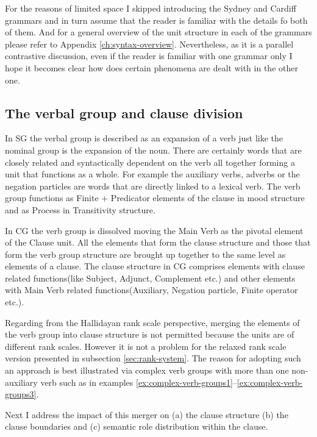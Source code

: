 For the reasons of limited space I skipped introducing the Sydney and Cardiff grammars and in turn assume that the reader is familiar with the details fo both of them. And for a general overview of the unit structure in each of the grammars please refer to Appendix \ref{ch:syntax-overview}. Nevertheless, as it is a parallel contrastive discussion, even if the reader is familiar with one grammar only I hope it becomes clear how does certain phenomena are dealt with in the other one. 

\subsection{The verbal group and clause division}
\label{sec:verbal-grpoup-and-clause-division}
In SG the verbal group is described as an expansion of a verb just like the nominal group is the expansion of the noun\citep[p.396]{Halliday2013}. There are certainly words that are closely related and syntactically dependent on the verb all together forming a unit that functions as a whole. For example the auxiliary verbs, adverbs or the negation particles are words that are directly linked to a lexical verb. The verb group functions as Finite + Predicator elements of the clause in mood structure and as Process in Transitivity structure. 

In CG the verb group is dissolved moving the Main Verb as the pivotal element of the Clause unit. All the elements that form the clause structure and those that form the verb group structure are brought up together to the same level as elements of a clause. The clause structure in CG comprises elements with clause related functions(like Subject, Adjunct, Complement etc.) and other elements with Main Verb related functions(Auxiliary, Negation particle, Finite operator etc.).

Regarding from the Hallidayan rank scale perspective, merging the elements of the verb group into clause structure is not permitted because the units are of different rank scales. However it is not a problem for the relaxed rank scale version presented in subsection \ref{sec:rank-system}. The reason for adopting such an approach is best illustrated via complex verb groups with more than one non-auxiliary verb such as in examples \ref{ex:complex-verb-groups1}--\ref{ex:complex-verb-groups3}. 

Next I address the impact of this merger on (a) the clause structure (b) the clause boundaries and (c) semantic role distribution within the clause.

